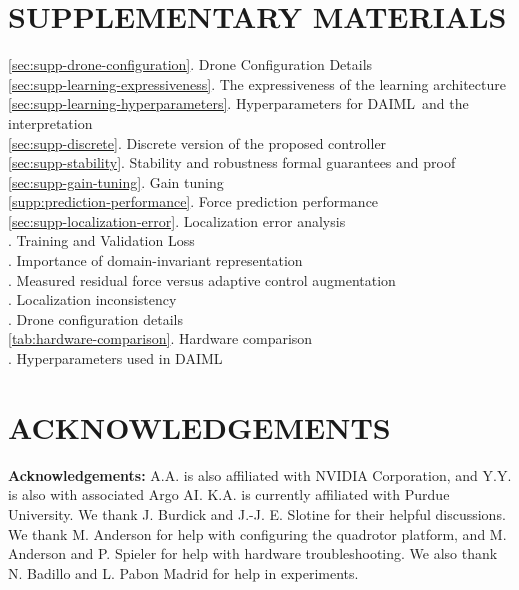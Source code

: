 \documentclass[11pt]{article}
\newcommand{\rev}[1]{{#1}}
\newcommand{\DAML}[0]{DAIML}
\begin{document}




\section*{SUPPLEMENTARY MATERIALS}
\ref{sec:supp-drone-configuration}. Drone Configuration Details \\
\ref{sec:supp-learning-expressiveness}. The expressiveness of the learning architecture \\
\ref{sec:supp-learning-hyperparameters}. Hyperparameters for \DAML~\rev{and the interpretation} \\
\ref{sec:supp-discrete}. Discrete version of the proposed controller \\
\ref{sec:supp-stability}. Stability and robustness formal guarantees and proof \\
\ref{sec:supp-gain-tuning}. Gain tuning \\
\rev{\ref{supp:prediction-performance}. Force prediction performance} \\
\ref{sec:supp-localization-error}. Localization error analysis \\
. Training and Validation Loss\\
. Importance of domain-invariant representation\\
. Measured residual force versus adaptive control augmentation \\
. Localization inconsistency \\
. Drone configuration details \\
\cref{tab:hardware-comparison}. Hardware comparison\\
. Hyperparameters used in DAIML

\renewcommand{\refname}{REFERENCES}


% 

\section*{ACKNOWLEDGEMENTS}
\textbf{Acknowledgements:} A.A. is also affiliated with NVIDIA Corporation, and Y.Y. is also with associated Argo AI. K.A. is currently affiliated with Purdue University. We thank J. Burdick and J.-J. E. Slotine for their helpful discussions. We thank M. Anderson for help with configuring the quadrotor platform, and M. Anderson and P. Spieler for help with hardware troubleshooting. We also thank N. Badillo and L. Pabon Madrid for help in experiments.
\end{document}
